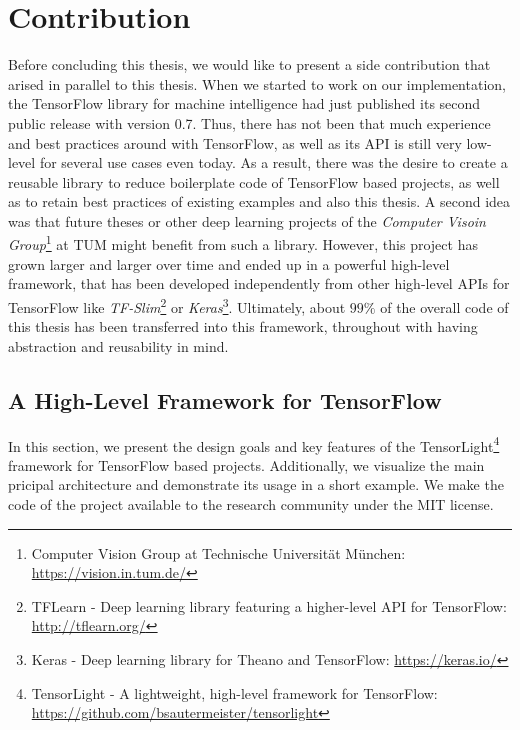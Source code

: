 

\chapter{Contribution} \label{chapter:contribution}

Before concluding this thesis, we would like to present a side contribution that arised in parallel to this thesis. When we started to work on our implementation, the TensorFlow library for machine intelligence had just published its second public release with version \num{0.7}. Thus, there has not been that much experience and best practices around with TensorFlow, as well as its API is still very low-level for several use cases even today. As a result, there was the desire to create a reusable library to reduce boilerplate code of TensorFlow based projects, as well as to retain best practices of existing examples and also this thesis. A second idea was that future theses or other deep learning projects of the \textit{Computer Visoin Group}\footnote{Computer Vision Group at Technische Universität München: \url{https://vision.in.tum.de/}} at TUM might benefit from such a library. However, this project has grown larger and larger over time and ended up in a powerful high-level framework, that has been developed independently from other high-level APIs for TensorFlow like \textit{TF-Slim}\footnote{TFLearn - Deep learning library featuring a higher-level API for TensorFlow: \url{http://tflearn.org/}} or \textit{Keras}\footnote{Keras - Deep learning library for Theano and TensorFlow: \url{https://keras.io/}}. Ultimately, about $ 99\% $ of the overall code of this thesis has been transferred into this framework, throughout with having abstraction and reusability in mind.


\section{A High-Level Framework for TensorFlow}

In this section, we present the design goals and key features of the TensorLight\footnote{TensorLight - A lightweight, high-level framework for TensorFlow:\\ \url{https://github.com/bsautermeister/tensorlight}} framework for TensorFlow based projects. Additionally, we visualize the main pricipal architecture and demonstrate its usage in a short example. We make the code of the project available to the research community under the MIT license.

